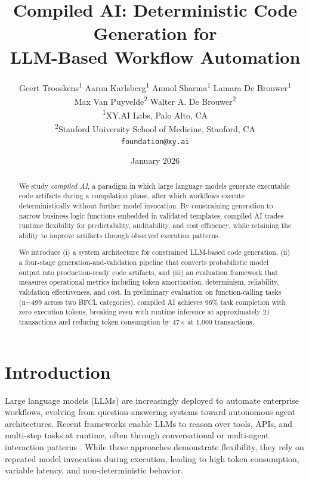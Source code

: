 \documentclass[11pt]{article}
\title{Compiled AI: Deterministic Code Generation for\\LLM-Based Workflow Automation}
\author{
  Geert Trooskens\textsuperscript{1} \quad
  Aaron Karlsberg\textsuperscript{1} \quad
  Anmol Sharma\textsuperscript{1} \quad
  Lamara De Brouwer\textsuperscript{1} \\[0.3em]
  Max Van Puyvelde\textsuperscript{2} \quad
  Walter A. De Brouwer\textsuperscript{2}
  \\[1em]
  \textsuperscript{1}XY.AI Labs, Palo Alto, CA \\
  \textsuperscript{2}Stanford University School of Medicine, Stanford, CA \\[0.5em]
  \texttt{foundation@xy.ai}
}
\date{January 2026}
\begin{document}
\maketitle

\begin{abstract}

We study \emph{compiled AI}, a paradigm in which large language models generate executable code artifacts during a compilation phase, after which workflows execute deterministically without further model invocation. By constraining generation to narrow business-logic functions embedded in validated templates, compiled AI trades runtime flexibility for predictability, auditability, and cost efficiency, while retaining the ability to improve artifacts through observed execution patterns.

We introduce (i) a system architecture for constrained LLM-based code generation, (ii) a four-stage generation-and-validation pipeline that converts probabilistic model output into production-ready code artifacts, and (iii) an evaluation framework that measures operational metrics including token amortization, determinism, reliability, validation effectiveness, and cost. In preliminary evaluation on function-calling tasks (n=499 across two BFCL categories), compiled AI achieves 96\% task completion with zero execution tokens, breaking even with runtime inference at approximately 21 transactions and reducing token consumption by 47$\times$ at 1,000 transactions.

\end{abstract}

\section{Introduction}
\label{sec:introduction}

Large language models (LLMs) are increasingly deployed to automate enterprise workflows, evolving from question-answering systems toward autonomous agent architectures. Recent frameworks enable LLMs to reason over tools, APIs, and multi-step tasks at runtime, often through conversational or multi-agent interaction patterns \citep{autogen2024, crewai2024, langchain2022}. While these approaches demonstrate flexibility, they rely on repeated model invocation during execution, leading to high token consumption, variable latency, and non-deterministic behavior.
\end{document}
